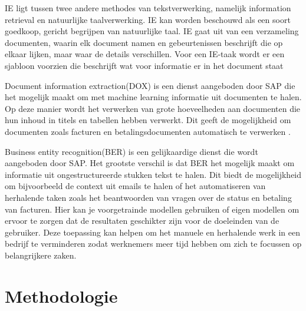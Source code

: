 IE ligt tussen twee andere methodes van tekstverwerking, namelijk information retrieval en natuurlijke taalverwerking. IE kan worden beschouwd als een soort goedkoop, gericht begrijpen van natuurlijke taal. IE gaat uit van een verzameling documenten, waarin elk document namen en gebeurtenissen beschrijft die op elkaar lijken, maar waar de details verschillen. Voor een IE-taak wordt er een sjabloon voorzien die beschrijft wat voor informatie er in het document staat \autocite{Freitag2000}

Document information extraction(DOX) is een dienst aangeboden door SAP die het mogelijk maakt om met machine learning informatie uit documenten te halen. Op deze manier wordt het verwerken van grote hoeveelheden aan documenten die hun inhoud in titels en tabellen hebben verwerkt. Dit geeft de mogelijkheid om documenten zoals facturen en betalingsdocumenten automatisch te verwerken \autocite{SAPDOX}.

Business entity recognition(BER) is een gelijkaardige dienst die wordt aangeboden door SAP. Het grootste verschil is dat BER het mogelijk maakt om informatie uit ongestructureerde stukken tekst te halen. Dit biedt de mogelijkheid om bijvoorbeeld de context uit emails te halen of het automatiseren van herhalende taken zoals het beantwoorden van vragen over de status en betaling van facturen. Hier kan je voorgetrainde modellen gebruiken of eigen modellen om ervoor te zorgen dat de resultaten geschikter zijn voor de doeleinden van de gebruiker. Deze toepassing kan helpen om het manuele en herhalende werk in een bedrijf te verminderen zodat werknemers meer tijd hebben om zich te focussen op belangrijkere zaken. \autocite{SAPBER}
\section{Methodologie}%
\label{sec:methodologie}

